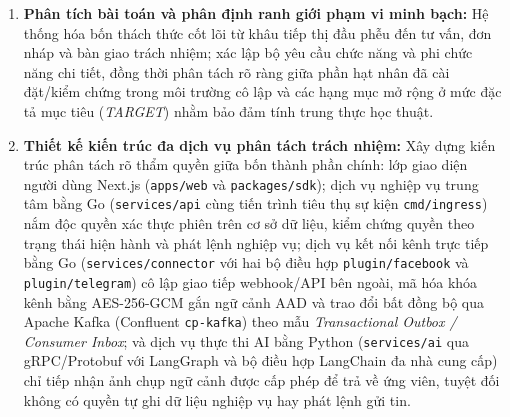 \begin{enumerate}
  \item \textbf{Phân tích bài toán và phân định ranh giới phạm vi minh bạch:} Hệ thống hóa bốn thách thức cốt lõi từ khâu tiếp thị đầu phễu đến tư vấn, đơn nháp và bàn giao trách nhiệm; xác lập bộ yêu cầu chức năng và phi chức năng chi tiết, đồng thời phân tách rõ ràng giữa phần hạt nhân đã cài đặt/kiểm chứng trong môi trường cô lập và các hạng mục mở rộng ở mức đặc tả mục tiêu (\emph{TARGET}) nhằm bảo đảm tính trung thực học thuật.
  \item \textbf{Thiết kế kiến trúc đa dịch vụ phân tách trách nhiệm:} Xây dựng kiến trúc phân tách rõ thẩm quyền giữa bốn thành phần chính: lớp giao diện người dùng Next.js (\texttt{apps/\hspace{0pt}web} và \texttt{packages/\hspace{0pt}sdk}); dịch vụ nghiệp vụ trung tâm bằng Go (\texttt{services/\hspace{0pt}api} cùng tiến trình tiêu thụ sự kiện \texttt{cmd/\hspace{0pt}ingress}) nắm độc quyền xác thực phiên trên cơ sở dữ liệu, kiểm chứng quyền theo trạng thái hiện hành và phát lệnh nghiệp vụ; dịch vụ kết nối kênh trực tiếp bằng Go (\texttt{services/\hspace{0pt}connector} với hai bộ điều hợp \texttt{plugin/\hspace{0pt}facebook} và \texttt{plugin/\hspace{0pt}telegram}) cô lập giao tiếp webhook/\hspace{0pt}API bên ngoài, mã hóa khóa kênh bằng AES-256-GCM gắn ngữ cảnh AAD và trao đổi bất đồng bộ qua Apache Kafka (Confluent \texttt{cp-\hspace{0pt}kafka}) theo mẫu \emph{Transactional Outbox / Consumer Inbox}; và dịch vụ thực thi AI bằng Python (\texttt{services/\hspace{0pt}ai} qua gRPC/\hspace{0pt}Protobuf với LangGraph và bộ điều hợp LangChain đa nhà cung cấp) chỉ tiếp nhận ảnh chụp ngữ cảnh được cấp phép để trả về ứng viên, tuyệt đối không có quyền tự ghi dữ liệu nghiệp vụ hay phát lệnh gửi tin.

\end{enumerate}
